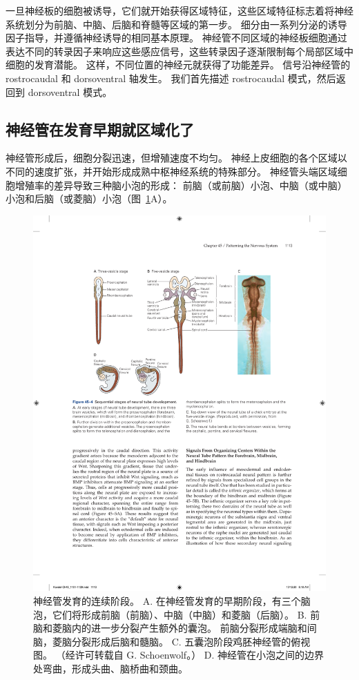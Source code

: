 一旦神经板的细胞被诱导，它们就开始获得区域特征，这些区域特征标志着将神经系统划分为前脑、中脑、后脑和脊髓等区域的第一步。
细分由一系列分泌的诱导因子指导，并遵循神经诱导的相同基本原理。
神经管不同区域的神经板细胞通过表达不同的转录因子来响应这些感应信号，这些转录因子逐渐限制每个局部区域中细胞的发育潜能。
这样，不同位置的神经元就获得了功能差异。
信号沿神经管的 rostrocaudal 和 dorsoventral 轴发生。
我们首先描述 rostrocaudal 模式，然后返回到 dorsoventral 模式。



\subsection{神经管在发育早期就区域化了}

神经管形成后，细胞分裂迅速，但增殖速度不均匀。
神经上皮细胞的各个区域以不同的速度扩张，并开始形成成熟中枢神经系统的特殊部分。
神经管头端区域细胞增殖率的差异导致三种脑小泡的形成：
前脑（或前脑）小泡、中脑（或中脑）小泡和后脑（或菱脑）小泡（图~\ref{fig:45_4}A）。


\begin{figure}[htbp]
	\centering
	\includegraphics[width=0.8\linewidth]{chap45/fig_45_4}
	\caption{神经管发育的连续阶段。 A. 在神经管发育的早期阶段，有三个脑泡，它们将形成前脑（前脑）、中脑（中脑）和菱脑（后脑）。 B. 前脑和菱脑内的进一步分裂产生额外的囊泡。 前脑分裂形成端脑和间脑，菱脑分裂形成后脑和髓脑。 C. 五囊泡阶段鸡胚神经管的俯视图。 （经许可转载自 G. Schoenwolf。） D. 神经管在小泡之间的边界处弯曲，形成头曲、脑桥曲和颈曲。}
	\label{fig:45_4}
\end{figure}


